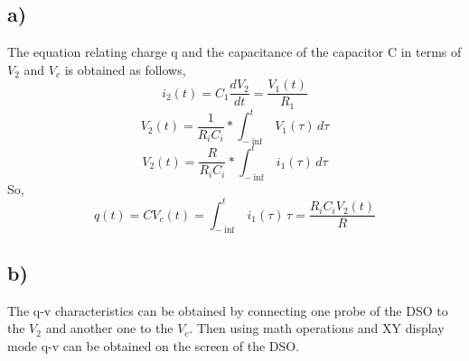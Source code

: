\documentclass[letterpaper,12pt]{article}
\begin{document}
\subsection{a)}
The equation relating charge q and the capacitance of the capacitor C in terms of \(V_2\) and \(V_c\) is obtained as follows,
\[ i_2(t) = C_1 \frac{d V_2}{dt} = \frac{V_1(t)}{R_1}
\]
\[
	V_2(t) = \frac{1}{R_i C_i} * \int_{-\inf}^{t} V_1(\tau) \, d\tau
	\]
	\[
		V_2(t) = \frac{R}{R_i C_i} * \int_{-\inf}^{t} i_1(\tau) \, d\tau
		\]
So, 
\[ q(t) = C V_c(t) = \int_{-\inf}^{t} i_1(\tau) \,\tau = \frac{R_i C_i V_2(t)}{R} \]
\subsection{b)}
The q-v characteristics can be obtained by connecting one probe of the DSO to the \(V_2\) and another one to the \(V_c\). Then using math operations and XY display mode q-v can be obtained on the screen of the DSO.
\end{document}
